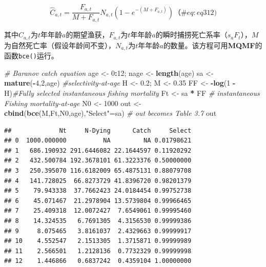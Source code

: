 \documentclass[
  lang=cn,
  11pt,
  scheme=chinese,
  chinesefont=nofont,
  citestyle=gb7714-2015,
  bibstyle=gb7714-2015]{elegantbook}
\newenvironment{Shaded}{\begin{snugshade}}{\end{snugshade}}
\newcommand{\CommentTok}[1]{\textcolor[rgb]{0.56,0.35,0.01}{\textit{#1}}}
\newcommand{\DecValTok}[1]{\textcolor[rgb]{0.00,0.00,0.81}{#1}}
\newcommand{\FloatTok}[1]{\textcolor[rgb]{0.00,0.00,0.81}{#1}}
\newcommand{\FunctionTok}[1]{\textcolor[rgb]{0.13,0.29,0.53}{\textbf{#1}}}
\newcommand{\NormalTok}[1]{#1}
\newcommand{\OtherTok}[1]{\textcolor[rgb]{0.56,0.35,0.01}{#1}}
\newcommand{\SpecialCharTok}[1]{\textcolor[rgb]{0.81,0.36,0.00}{\textbf{#1}}}
\newcommand{\StringTok}[1]{\textcolor[rgb]{0.31,0.60,0.02}{#1}}
\begin{document}
\begin{equation}  
{{\hat{C}}_{a,t}}=\frac{{F}_{a,t}}{M+{F}_{a,t}}{{N}_{a,t}}\left( 1-{{e}^{-\left( M+{{F}_{a,t}} \right)}} \right)  
（\#eq:eq312)  
\end{equation}

其中\(\hat{C}_{a,t}\)为\(t\)年年龄\(a\)的期望渔获，\(F_{a,t}\)为\(t\)年年龄\(a\)的瞬时捕捞死亡系率（\(s_aF_t\)），\(M\)为自然死亡率（假设年龄间不变），\(N_{a,t}\)为\(t\)年年龄\(a\)的数量。该方程可用\textbf{MQMF}的函数\texttt{bce()}运行。

\begin{Shaded}
\begin{Highlighting}[]
 \CommentTok{\# Baranov catch equation  }
\NormalTok{age }\OtherTok{\textless{}{-}} \DecValTok{0}\SpecialCharTok{:}\DecValTok{12}\NormalTok{;  nage }\OtherTok{\textless{}{-}} \FunctionTok{length}\NormalTok{(age)   }
\NormalTok{sa }\OtherTok{\textless{}{-}}\FunctionTok{mature}\NormalTok{(}\SpecialCharTok{{-}}\DecValTok{4}\NormalTok{,}\DecValTok{2}\NormalTok{,age) }\CommentTok{\#selectivity{-}at{-}age  }
\NormalTok{H }\OtherTok{\textless{}{-}} \FloatTok{0.2}\NormalTok{;  M }\OtherTok{\textless{}{-}} \FloatTok{0.35}  
\NormalTok{FF }\OtherTok{\textless{}{-}} \SpecialCharTok{{-}}\FunctionTok{log}\NormalTok{(}\DecValTok{1} \SpecialCharTok{{-}}\NormalTok{ H)}\CommentTok{\#Fully selected instantaneous fishing mortality  }
\NormalTok{Ft }\OtherTok{\textless{}{-}}\NormalTok{ sa }\SpecialCharTok{*}\NormalTok{ FF     }\CommentTok{\# instantaneous Fishing mortality{-}at{-}age  }
\NormalTok{N0 }\OtherTok{\textless{}{-}} \DecValTok{1000}  
\NormalTok{out }\OtherTok{\textless{}{-}} \FunctionTok{cbind}\NormalTok{(}\FunctionTok{bce}\NormalTok{(M,Ft,N0,age),}\StringTok{"Select"}\OtherTok{=}\NormalTok{sa)  }\CommentTok{\# out becomes Table 3.7  }
\NormalTok{out}
\end{Highlighting}
\end{Shaded}

\begin{verbatim}
##             Nt     N-Dying      Catch     Select
## 0  1000.000000          NA         NA 0.01798621
## 1   686.190932 291.6446082 22.1644597 0.11920292
## 2   432.500784 192.3678101 61.3223376 0.50000000
## 3   250.395070 116.6182009 65.4875131 0.88079708
## 4   141.728025  66.8273729 41.8396720 0.98201379
## 5    79.943338  37.7662423 24.0184454 0.99752738
## 6    45.071467  21.2978904 13.5739804 0.99966465
## 7    25.409318  12.0072427  7.6549061 0.99995460
## 8    14.324535   6.7691305  4.3156530 0.99999386
## 9     8.075465   3.8161037  2.4329663 0.99999917
## 10    4.552547   2.1513305  1.3715871 0.99999989
## 11    2.566501   1.2128136  0.7732329 0.99999998
## 12    1.446866   0.6837242  0.4359104 1.00000000
\end{verbatim}
\end{document}

